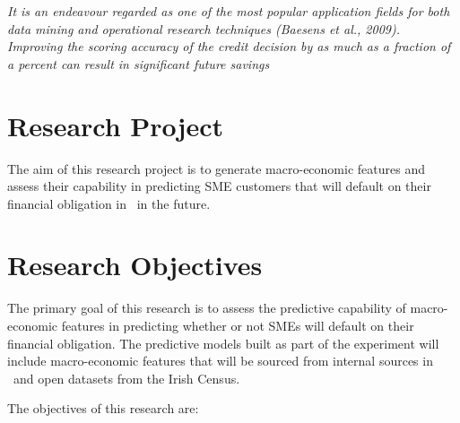 \textit{It is an endeavour regarded as one of the most popular
application fields for both data mining and operational research techniques (Baesens
et al., 2009). Improving the scoring accuracy of the credit decision by as much as
a fraction of a percent can result in significant future savings}

\section{Research Project}

The aim of this research project is to generate macro-economic features and assess their capability in predicting SME customers that will default on  their financial obligation in \subjectname\ in the future.


\section{Research Objectives}
The primary goal of this research is to assess the predictive capability of macro-economic features in predicting whether or not SMEs will default on their financial obligation. The predictive models built as part of the experiment will include macro-economic features that will be sourced from internal sources in \subjectname\ and open datasets from the Irish Census.

 
The objectives of this research are:

